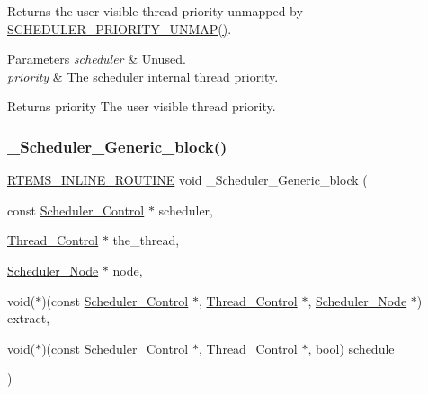 Returns the user visible thread priority unmapped by \mbox{\hyperlink{group__RTEMSScoreScheduler_gaa878c63b883116f813b814c90f8af849}{S\+C\+H\+E\+D\+U\+L\+E\+R\+\_\+\+P\+R\+I\+O\+R\+I\+T\+Y\+\_\+\+U\+N\+M\+A\+P()}}. 


\begin{DoxyParams}{Parameters}
{\em scheduler} & Unused. \\
\hline
{\em priority} & The scheduler internal thread priority.\\
\hline
\end{DoxyParams}
\begin{DoxyReturn}{Returns}
priority The user visible thread priority. 
\end{DoxyReturn}
\mbox{\label{group__RTEMSScoreScheduler_ga582a9364e4794778595d769e3f4f4693}} 
\subsubsection{\texorpdfstring{\_Scheduler\_Generic\_block()}{\_Scheduler\_Generic\_block()}}
{\footnotesize\ttfamily \mbox{\hyperlink{group__RTEMSScoreBaseDefs_gac216239df231d5dbd15e3520b0b9313f}{R\+T\+E\+M\+S\+\_\+\+I\+N\+L\+I\+N\+E\+\_\+\+R\+O\+U\+T\+I\+NE}} void \+\_\+\+Scheduler\+\_\+\+Generic\+\_\+block (\begin{DoxyParamCaption}\item[{const \mbox{\hyperlink{struct__Scheduler__Control}{Scheduler\+\_\+\+Control}} $\ast$}]{scheduler,  }\item[{\mbox{\hyperlink{struct__Thread__Control}{Thread\+\_\+\+Control}} $\ast$}]{the\+\_\+thread,  }\item[{\mbox{\hyperlink{structScheduler__Node}{Scheduler\+\_\+\+Node}} $\ast$}]{node,  }\item[{void($\ast$)(const \mbox{\hyperlink{struct__Scheduler__Control}{Scheduler\+\_\+\+Control}} $\ast$, \mbox{\hyperlink{struct__Thread__Control}{Thread\+\_\+\+Control}} $\ast$, \mbox{\hyperlink{structScheduler__Node}{Scheduler\+\_\+\+Node}} $\ast$)}]{extract,  }\item[{void($\ast$)(const \mbox{\hyperlink{struct__Scheduler__Control}{Scheduler\+\_\+\+Control}} $\ast$, \mbox{\hyperlink{struct__Thread__Control}{Thread\+\_\+\+Control}} $\ast$, bool)}]{schedule }\end{DoxyParamCaption})}



